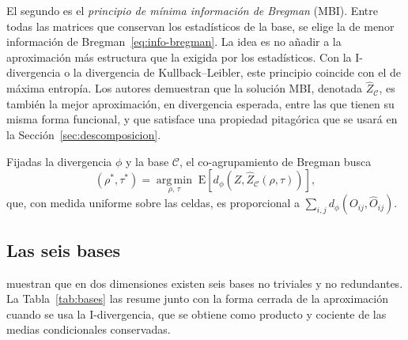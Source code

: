 El segundo es el \emph{principio de mínima información de Bregman} (MBI). Entre
todas las matrices que conservan los estadísticos de la base, se elige la de menor
información de Bregman~\eqref{eq:info-bregman}. La idea es no añadir a la
aproximación más estructura que la exigida por los estadísticos. Con la
I-divergencia o la divergencia de Kullback--Leibler, este principio coincide con el
de máxima entropía. Los autores demuestran que la solución MBI, denotada
$\hat{Z}_{\mathcal{C}}$, es también la mejor aproximación, en divergencia esperada,
entre las que tienen su misma forma funcional, y que satisface una propiedad
pitagórica \cite[Lema~3 y Teorema~2]{Banerjee2007} que se usará en la
Sección~\ref{sec:descomposicion}.

Fijadas la divergencia $\phi$ y la base $\mathcal{C}$, el co-agrupamiento de
Bregman busca
\begin{equation}\label{eq:objetivo-bregman}
  (\rho^*, \tau^*) = \operatorname*{arg\,min}_{\rho,\, \tau}\;
  \mathrm{E}\!\left[ d_\phi\!\left(Z, \hat{Z}_{\mathcal{C}}(\rho, \tau)\right) \right],
\end{equation}
que, con medida uniforme sobre las celdas, es proporcional a
$\sum_{i,j} d_\phi(O_{ij}, \hat{O}_{ij})$.

\subsection{Las seis bases}\label{sec:bases}

\cite[Teorema~3]{Banerjee2007} muestran que en dos dimensiones existen seis bases
no triviales y no redundantes. La Tabla~\ref{tab:bases} las resume junto con la
forma cerrada de la aproximación cuando se usa la I-divergencia, que se obtiene
como producto y cociente de las medias condicionales conservadas.

